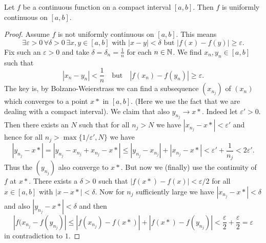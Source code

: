 \documentclass[10pt, a4paper]{article}
\begin{document}
\begin{theorem}
    Let $f$ be a continuous function on a compact interval $[a, b]$.
    Then $f$ is uniformly continuous on $[a, b]$.
    \begin{proof}
        Assume $f$ is not uniformly continuous on $[a, b]$.
        This means
        \[
        \exists\varepsilon > 0\, \forall\delta > 0\, \exists x, y \in [a, b]\text{ with } |x - y| < \delta \text{ but } |f(x) - f(y)| \geq \varepsilon.
        \]
        Fix such an $\varepsilon > 0$ and take $\delta = \delta_n = \frac{1}{n}$ for each $n \in \mathbb{N}$.
        We find $x_n, y_n \in [a, b]$ such that
        \[
        |x_n - y_n| < \frac{1}{n}\quad\text{but}\quad|f(x_n) - f(y_n)| \geq \varepsilon.
        \]
        The key is,
        by Bolzano-Weierstrass we can find a subsequence $(x_{n_j})$ of $(x_n)$ which converges to a point $x*$ in $[a, b]$.
        (Here we use the fact that we are dealing with a compact interval).
        We claim that also $y_{n_j} \rightarrow x*$.
        Indeed let $\varepsilon' > 0$.
        Then there exists an $N$ such that for all $n_j > N$ we have $|x_{n_j} - x*| < \varepsilon'$ and hence for all $n_j > \max\{1 / \varepsilon', N\}$ we have
        \[
        |y_{n_j} - x*| = |y_{n_j} - x_{n_j} + x_{n_j} - x*| \leq |y_{n_j} - x_{n_j}| + |x_{n_j} - x*| < \varepsilon' + \frac{1}{n_j} < 2\varepsilon'.
        \]
        Thus the $(y_{n_j})$ also converge to $x*$.
        But now we
        (finally)
        use the continuity of $f$ at $x*$.
        There exists a $\delta > 0$ such that $|f(x*) - f(x)| < \varepsilon / 2$ for all $x \in [a, b]$ with $|x - x*| < \delta$.
        Now for $n_j$ sufficiently large we have $|x_{n_j} - x*| < \delta$ and also $|y_{n_j} - x*| < \delta$ and then
        \[
        |f(x_{n_j} - f(y_{n_j})| \leq |f(x_{n_j}) - f(x*)| + |f(x*) - f(y_{n_j})| < \frac{\varepsilon}{2} + \frac{\varepsilon}{2} = \varepsilon
        \]
        in contradiction to $1$.
    \end{proof}
\end{theorem}
\end{document}
